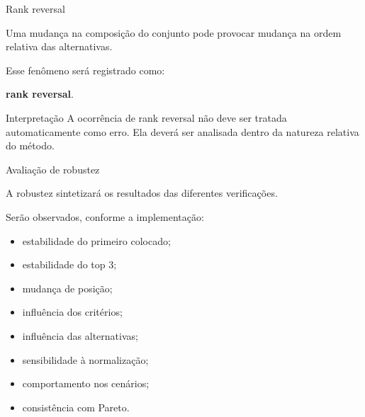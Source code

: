 
\begin{frame}{Rank reversal}

    Uma mudança na composição do conjunto pode provocar mudança na
    ordem relativa das alternativas.

    \vspace{0.3cm}

    Esse fenômeno será registrado como:

    \begin{center}
        \textbf{rank reversal}.
    \end{center}

    \vspace{0.3cm}

    \begin{alertblock}{Interpretação}
        A ocorrência de rank reversal não deve ser tratada
        automaticamente como erro. Ela deverá ser analisada dentro da
        natureza relativa do método.
    \end{alertblock}

\end{frame}



\begin{frame}{Avaliação de robustez}

    A robustez sintetizará os resultados das diferentes verificações.

    \vspace{0.3cm}

    Serão observados, conforme a implementação:

    \begin{itemize}
        \item estabilidade do primeiro colocado;
        \item estabilidade do top 3;
        \item mudança de posição;
        \item influência dos critérios;
        \item influência das alternativas;
        \item sensibilidade à normalização;
        \item comportamento nos cenários;
        \item consistência com Pareto.
    \end{itemize}

\end{frame}


